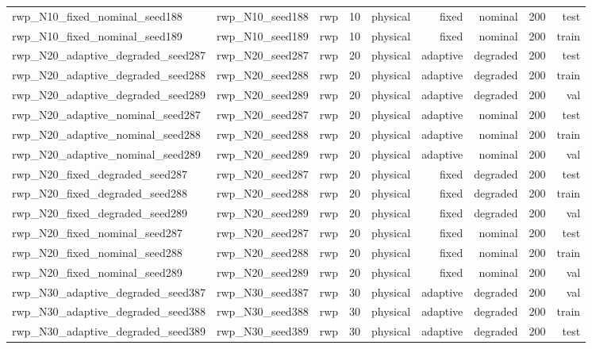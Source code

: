 \begin{tabular}{lrrrrrrrr}
rwp\_N10\_fixed\_nominal\_seed188 & rwp\_N10\_seed188 & rwp & 10 & physical & fixed & nominal & 200 & test \\
rwp\_N10\_fixed\_nominal\_seed189 & rwp\_N10\_seed189 & rwp & 10 & physical & fixed & nominal & 200 & train \\
rwp\_N20\_adaptive\_degraded\_seed287 & rwp\_N20\_seed287 & rwp & 20 & physical & adaptive & degraded & 200 & test \\
rwp\_N20\_adaptive\_degraded\_seed288 & rwp\_N20\_seed288 & rwp & 20 & physical & adaptive & degraded & 200 & train \\
rwp\_N20\_adaptive\_degraded\_seed289 & rwp\_N20\_seed289 & rwp & 20 & physical & adaptive & degraded & 200 & val \\
rwp\_N20\_adaptive\_nominal\_seed287 & rwp\_N20\_seed287 & rwp & 20 & physical & adaptive & nominal & 200 & test \\
rwp\_N20\_adaptive\_nominal\_seed288 & rwp\_N20\_seed288 & rwp & 20 & physical & adaptive & nominal & 200 & train \\
rwp\_N20\_adaptive\_nominal\_seed289 & rwp\_N20\_seed289 & rwp & 20 & physical & adaptive & nominal & 200 & val \\
rwp\_N20\_fixed\_degraded\_seed287 & rwp\_N20\_seed287 & rwp & 20 & physical & fixed & degraded & 200 & test \\
rwp\_N20\_fixed\_degraded\_seed288 & rwp\_N20\_seed288 & rwp & 20 & physical & fixed & degraded & 200 & train \\
rwp\_N20\_fixed\_degraded\_seed289 & rwp\_N20\_seed289 & rwp & 20 & physical & fixed & degraded & 200 & val \\
rwp\_N20\_fixed\_nominal\_seed287 & rwp\_N20\_seed287 & rwp & 20 & physical & fixed & nominal & 200 & test \\
rwp\_N20\_fixed\_nominal\_seed288 & rwp\_N20\_seed288 & rwp & 20 & physical & fixed & nominal & 200 & train \\
rwp\_N20\_fixed\_nominal\_seed289 & rwp\_N20\_seed289 & rwp & 20 & physical & fixed & nominal & 200 & val \\
rwp\_N30\_adaptive\_degraded\_seed387 & rwp\_N30\_seed387 & rwp & 30 & physical & adaptive & degraded & 200 & val \\
rwp\_N30\_adaptive\_degraded\_seed388 & rwp\_N30\_seed388 & rwp & 30 & physical & adaptive & degraded & 200 & train \\
rwp\_N30\_adaptive\_degraded\_seed389 & rwp\_N30\_seed389 & rwp & 30 & physical & adaptive & degraded & 200 & test \\

\end{tabular}

